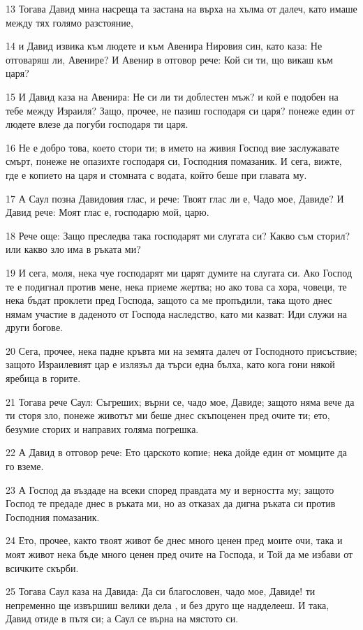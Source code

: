 \par 13 Тогава Давид мина насреща та застана на върха на хълма от далеч, като имаше между тях голямо разстояние,
\par 14 и Давид извика към людете и към Авенира Нировия син, като каза: Не отговаряш ли, Авенире? И Авенир в отговор рече: Кой си ти, що викаш към царя?
\par 15 И Давид каза на Авенира: Не си ли ти доблестен мъж? и кой е подобен на тебе между Израиля? Защо, прочее, не пазиш господаря си царя? понеже един от людете влезе да погуби господаря ти царя.
\par 16 Не е добро това, което стори ти; в името на живия Господ вие заслужавате смърт, понеже не опазихте господаря си, Господния помазаник. И сега, вижте, где е копието на царя и стомната с водата, който беше при главата му.
\par 17 А Саул позна Давидовия глас, и рече: Твоят глас ли е, Чадо мое, Давиде? И Давид рече: Моят глас е, господарю мой, царю.
\par 18 Рече още: Защо преследва така господарят ми слугата си? Какво съм сторил? или какво зло има в ръката ми?
\par 19 И сега, моля, нека чуе господарят ми царят думите на слугата си. Ако Господ те е подигнал против мене, нека приеме жертва; но ако това са хора, човеци, те нека бъдат проклети пред Господа, защото са ме пропъдили, така щото днес нямам участие в даденото от Господа наследство, като ми казват: Иди служи на други богове.
\par 20 Сега, прочее, нека падне кръвта ми на земята далеч от Господното присъствие; защото Израилевият цар е излязъл да търси една бълха, като кога гони някой яребица в горите.
\par 21 Тогава рече Саул: Съгреших; върни се, чадо мое, Давиде; защото няма вече да ти сторя зло, понеже животът ми беше днес скъпоценен пред очите ти; ето, безумие сторих и направих голяма погрешка.
\par 22 А Давид в отговор рече: Ето царското копие; нека дойде един от момците да го вземе.
\par 23 А Господ да въздаде на всеки според правдата му и верността му; защото Господ те предаде днес в ръката ми, но аз отказах да дигна ръката си против Господния помазаник.
\par 24 Ето, прочее, както твоят живот бе днес много ценен пред моите очи, така и моят живот нека бъде много ценен пред очите на Господа, и Той да ме избави от всичките скърби.
\par 25 Тогава Саул каза на Давида: Да си благословен, чадо мое, Давиде! ти непременно ще извършиш велики дела , и без друго ще надделееш. И така, Давид отиде в пътя си; а Саул се върна на мястото си.

